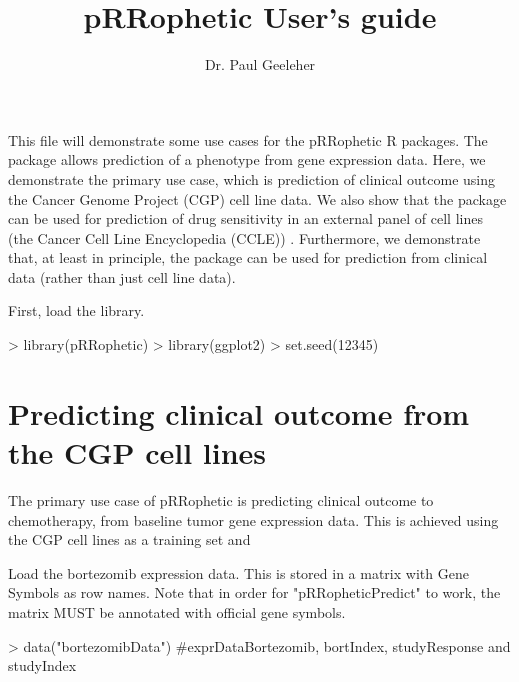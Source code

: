 \documentclass[a4paper]{article}
\title{pRRophetic User's guide}
\author{Dr. Paul Geeleher}
\begin{document}
\maketitle

This file will demonstrate some use cases for the pRRophetic R packages. The package allows prediction of a phenotype from gene expression data. Here, we demonstrate the primary use case, which is prediction of clinical outcome using the Cancer Genome Project (CGP) cell line data. We also show that the package can be used for prediction of drug sensitivity in an external panel of cell lines (the Cancer Cell Line Encyclopedia (CCLE)) . Furthermore, we demonstrate that, at least in principle, the package can be used for prediction from clinical data (rather than just cell line data).

First, load the library.
\begin{Schunk}
\begin{Sinput}
> library(pRRophetic)
> library(ggplot2)
> set.seed(12345)
\end{Sinput}
\end{Schunk}


\section{Predicting clinical outcome from the CGP cell lines}

The primary use case of pRRophetic is predicting clinical outcome to chemotherapy, from baseline tumor gene expression data. This is achieved using the CGP cell lines as a training set and 

Load the bortezomib expression data. This is stored in a matrix with Gene Symbols as row names. Note that in order for "pRRopheticPredict" to work, the matrix MUST be annotated with official gene symbols.
\begin{Schunk}
\begin{Sinput}
> data("bortezomibData") #exprDataBortezomib, bortIndex, studyResponse and studyIndex
\end{Sinput}
\end{Schunk}
\end{document}
